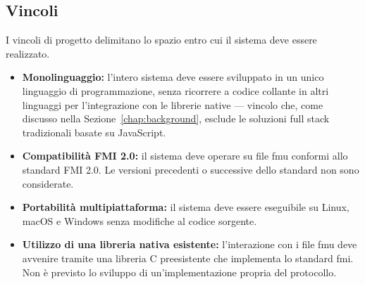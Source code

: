 \subsection{Vincoli}
\label{sec:analisi-vincoli}

I vincoli di progetto delimitano lo spazio entro cui il sistema deve essere realizzato.

\begin{itemize}
    \item \textbf{Monolinguaggio:} l'intero sistema deve essere sviluppato in un unico
    linguaggio di programmazione, senza ricorrere a codice collante in altri linguaggi per
    l'integrazione con le librerie native — vincolo che, come discusso nella Sezione~\ref{chap:background}, esclude
    le soluzioni full stack tradizionali basate su JavaScript.

    \item \textbf{Compatibilità FMI 2.0:} il sistema deve operare su file \ac{fmu} conformi
    allo standard FMI 2.0. Le versioni precedenti o successive dello standard non sono
    considerate.

    \item \textbf{Portabilità multipiattaforma:} il sistema deve essere eseguibile su Linux,
    macOS e Windows senza modifiche al codice sorgente.

    \item \textbf{Utilizzo di una libreria nativa esistente:} l'interazione con i file
    \ac{fmu} deve avvenire tramite una libreria C preesistente che implementa lo standard
    \ac{fmi}. Non è previsto lo sviluppo di un'implementazione propria del protocollo.
\end{itemize}